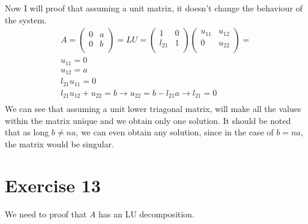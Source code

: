 Now I will proof that assuming a unit matrix, it doesn't change the behaviour of the system.
\begin{gather*}
A = \left( \begin{array}{cc}
0 & a \\
0 & b \\
\end{array} \right)
= LU = 
\left( \begin{array}{cc}
1 & 0 \\
l_{21} & 1 \\
\end{array} \right)
\left( \begin{array}{cc}
u_{11} & u_{12} \\
0 & u_{22} \\
\end{array} \right)
= \\
u_{11} = 0 \\
u_{12} = a   \\
l_{21} u_{11} = 0 \\
l_{21} u_{12} + u_{22} = b \rightarrow u_{22} = b - l_{21} a \rightarrow l_{21} = 0\\
\end{gather*}
We can see that assuming a unit lower triagonal matrix, will make all the values within the matrix unique and we obtain only one solution.
It should be noted that as long $b \neq n a$, we can even obtain any solution, since in the case of $b = n a$, the matrix would be singular.

\section{Exercise 13}
We need to proof that $A$ has an LU decomposition.

